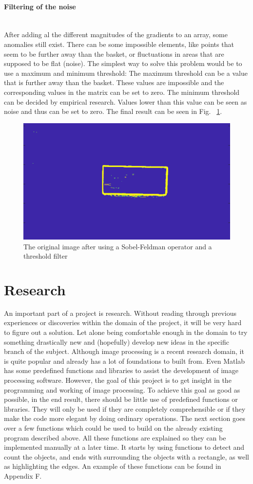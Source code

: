 \documentclass{article}
\begin{document}
\paragraph{Filtering of the noise}\mbox{}\\
After adding al the different magnitudes of the gradients to an array, some anomalies still exist. There can be some impossible elements, like points that seem to be further away than the basket, or fluctuations in areas that are supposed to be flat (noise). The simplest way to solve this problem would be to use a maximum and minimum threshold: The maximum threshold can be a value that is further away than the basket. These values are impossible and the corresponding values in the matrix can be set to zero. The minimum threshold can be decided by empirical research. Values lower than this value can be seen as noise and thus can be set to zero. The final result can be seen in Fig. ~\ref{fig:sobel_and_threshold}.

\begin{figure}[h]
	\center
  \includegraphics[width=0.6\linewidth]{sobel_and_threshold.png}
  \caption{The original image after using a Sobel-Feldman operator and a threshold filter}
  \label{fig:sobel_and_threshold}
\end{figure}

\section{Research}
An important part of a project is research. Without reading through previous experiences or discoveries within the domain of the project, it will be very hard to figure out a solution. Let alone being comfortable enough in the domain to try something drastically new and (hopefully) develop new ideas in the specific branch of the subject. Although image processing is a recent research domain, it is quite popular and already has a lot of foundations to built from. Even Matlab has some predefined functions and libraries to assist the development of image processing software.
However, the goal of this project is to get insight in the programming and working of image processing. To achieve this goal as good as possible, in the end result, there should be little use of predefined functions or libraries. They will only be used if they are completely comprehensible or if they make the code more elegant by doing ordinary operations. 
The next section goes over a few functions which could be used to build on the already existing program described above. All these functions are explained so they can be implemented manually at a later time. It starts by using functions to detect and count the objects, and ends with surrounding the objects with a rectangle, as well as highlighting the edges. An example of these functions can be found in Appendix F.
\end{document}
